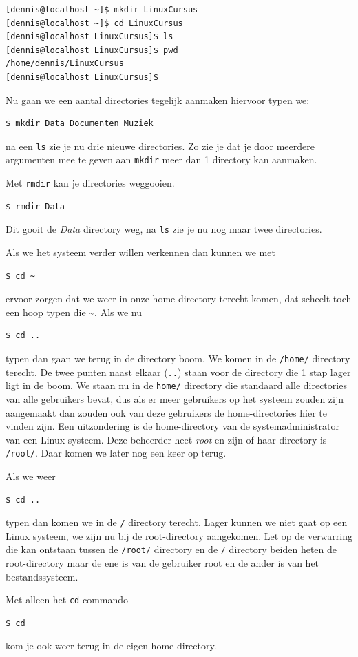 \begin{lstlisting}[language=bash]
[dennis@localhost ~]$ mkdir LinuxCursus
[dennis@localhost ~]$ cd LinuxCursus
[dennis@localhost LinuxCursus]$ ls
[dennis@localhost LinuxCursus]$ pwd
/home/dennis/LinuxCursus
[dennis@localhost LinuxCursus]$
\end{lstlisting}

Nu gaan we een aantal directories tegelijk aanmaken hiervoor typen we:
\begin{lstlisting}[language=bash]
$ mkdir Data Documenten Muziek
\end{lstlisting}
na een \texttt{ls} zie je nu drie nieuwe directories. Zo zie je dat je door meerdere argumenten mee te geven aan \texttt{mkdir} meer dan 1 directory kan aanmaken.

Met \texttt{rmdir} kan je directories weggooien.
\begin{lstlisting}[language=bash]
$ rmdir Data
\end{lstlisting}
Dit gooit de \textit{Data} directory weg, na \texttt{ls} zie je nu nog maar twee directories.

Als we het systeem verder willen verkennen dan kunnen we met
\begin{lstlisting}[language=bash]
$ cd ~
\end{lstlisting}
ervoor zorgen dat we weer in onze home-directory terecht komen, dat scheelt toch een hoop typen die \~{}. Als we nu
\begin{lstlisting}[language=bash]
$ cd ..
\end{lstlisting}
typen dan gaan we terug in de directory boom. We komen in de \texttt{/home/} directory terecht. De twee punten naast elkaar (\texttt{..}) staan voor de directory die 1 stap lager ligt in de boom. We staan nu in de \texttt{home/} directory die standaard alle directories van alle gebruikers bevat, dus als er meer gebruikers op het systeem zouden zijn aangemaakt dan zouden ook van deze gebruikers de home-directories hier te vinden zijn. Een uitzondering is de home-directory van de systemadministrator van een Linux systeem. Deze beheerder heet \textit{root} en zijn of haar directory is \texttt{/root/}. Daar komen we later nog een keer op terug.

Als we weer
\begin{lstlisting}[language=bash]
$ cd ..
\end{lstlisting}
typen dan komen we in de \texttt{/} directory terecht. Lager kunnen we niet gaat op een Linux systeem, we zijn nu bij de root-directory aangekomen. Let op de verwarring die kan ontstaan tussen de \texttt{/root/} directory en de \texttt{/} directory beiden heten de root-directory maar de ene is van de gebruiker root en de ander is van het bestandssysteem.

Met alleen het \texttt{cd} commando
\begin{lstlisting}[language=bash]
$ cd
\end{lstlisting}
kom je ook weer terug in de eigen home-directory.

